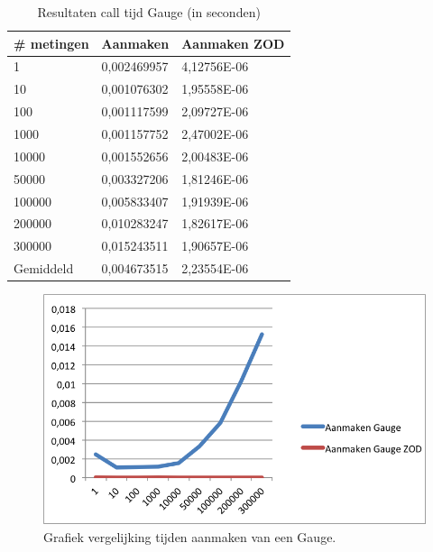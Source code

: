 \begin{table}[]
\centering
\begin{tabular}{|l|l|l|}
\hline
\# metingen & Aanmaken    & Aanmaken ZOD \\ \hline
1           & 0,002469957 & 4,12756E-06  \\ \hline
10          & 0,001076302 & 1,95558E-06  \\ \hline
100         & 0,001117599 & 2,09727E-06  \\ \hline
1000        & 0,001157752 & 2,47002E-06  \\ \hline
10000       & 0,001552656 & 2,00483E-06  \\ \hline
50000       & 0,003327206 & 1,81246E-06  \\ \hline
100000      & 0,005833407 & 1,91939E-06  \\ \hline
200000      & 0,010283247 & 1,82617E-06  \\ \hline
300000      & 0,015243511 & 1,90657E-06  \\ \hline
Gemiddeld   & 0,004673515 & 2,23554E-06  \\ \hline
\end{tabular}
\caption{Resultaten call tijd Gauge (in seconden)}
\label{Table:Gauge}
\end{table}

\begin{figure}[!h]
  \centering
  \includegraphics[scale=1.0]{Afbeeldingen/Evaluatie/AanmakenGauge}
  \caption{Grafiek vergelijking tijden aanmaken van een Gauge.}
  \label{fig:GraphGauge}
\end{figure}


